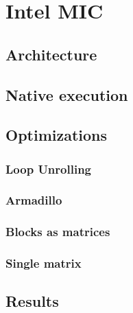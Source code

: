 \documentclass[../thesis]{subfiles}
\begin{document}
	\chapter{Intel MIC}
	\label{chp:mic}
	\section{Architecture}
	\section{Native execution}
	\section{Optimizations}
		\subsection{Loop Unrolling}
		\subsection{Armadillo}
		\subsection{Blocks as matrices}
		\subsection{Single matrix}
	\section{Results}
\end{document}
